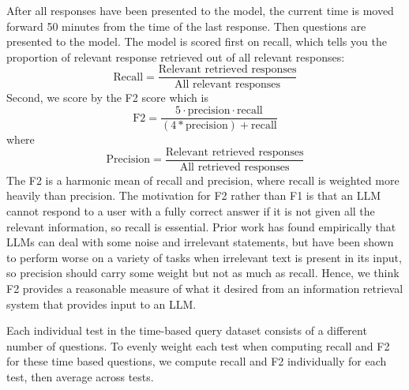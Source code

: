 \documentclass{article}
\begin{document}
After all responses have been presented to the model, the current time is moved forward 50 minutes from the time of the last response. Then questions are presented to the model. The model is scored first on recall, which tells you the proportion of relevant response retrieved out of all relevant responses:
\begin{equation}
\text{Recall} = \frac{\text{Relevant retrieved responses}}{\text{All relevant responses}}
\end{equation}
Second, we score by the F2 score which is
\begin{equation}
\text{F2} = \frac{5 \cdot \text{precision} \cdot \text{recall}}{(4 * \text{precision}) + \text{recall}}
\end{equation}
where 
\begin{equation}
\text{Precision} = \frac{\text{Relevant retrieved responses}}{\text{All retrieved responses}}
\end{equation}
The F2 is a harmonic mean of recall and precision, where recall is weighted more heavily than precision. The motivation for F2 rather than F1 is that an LLM cannot respond to a user with a fully correct answer if it is not given all the relevant information, so recall is essential. Prior work \cite{levy2024same} has found empirically that LLMs can deal with some noise and irrelevant statements, but have been shown to perform worse on a variety of tasks when irrelevant text is present in its input, so precision should carry some weight but not as much as recall. Hence, we think F2 provides a reasonable measure of what it desired from an information retrieval system that provides input to an LLM.

Each individual test in the time-based query dataset consists of a different number of questions. To evenly weight each test when computing recall and F2 for these time based questions, we compute recall and F2 individually for each test, then average across tests.
\end{document}
